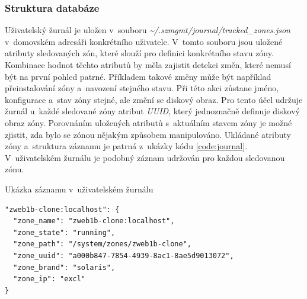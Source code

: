 \subsubsection{Struktura databáze}
\label{chapter:implementation:client:journal:database}
Uživatelský žurnál je uložen v~souboru \textit{\textasciitilde/.szmgmt/journal/tracked\_zones.json} v~domovském adresáři
konkrétního uživatele. V~tomto souboru jsou uložené atributy sledovaných zón, které slouží pro definici konkrétního stavu zóny.
Kombinace hodnot těchto atributů by měla zajistit detekci změn, které nemusí být na první pohled patrné. Příkladem takové změny
může být například přeinstalování zóny a~navození stejného stavu. Při této akci zůstane jméno, konfigurace a~stav zóny stejné,
ale změní se diskový obraz. Pro tento účel udržuje žurnál u~každé sledované zóny atribut \textit{UUID}, který jednoznačně
definuje diskový obraz zóny. Porovnáním uložených atributů s~aktuálním stavem zóny je možné zjistit, zda bylo se zónou 
nějakým způsobem manipulováno. Ukládané atributy zóny a~struktura záznamu je patrná z~ukázky kódu \ref{code:journal}.
V~uživatelském žurnálu je podobný záznam udržován pro každou sledovanou zónu.
\begin{listing}[ht]
  \caption{Ukázka záznamu v~uživatelském žurnálu}
  \begin{verbatim} 
"zweb1b-clone:localhost": {
  "zone_name": "zweb1b-clone:localhost",
  "zone_state": "running",
  "zone_path": "/system/zones/zweb1b-clone",
  "zone_uuid": "a000b847-7854-4939-8ac1-8ae5d9013072",
  "zone_brand": "solaris",
  "zone_ip": "excl"
}
  \end{verbatim}
  \label{code:journal}
\end{listing}
